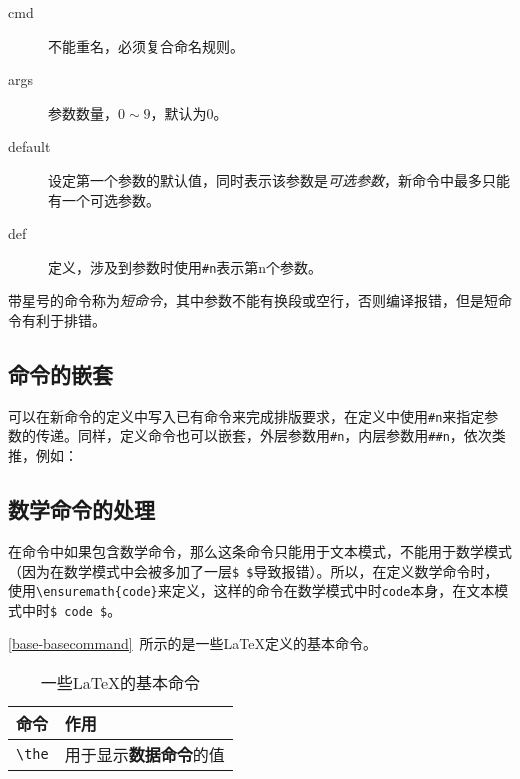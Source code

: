 \begin{description}
    \item[cmd] 不能重名，必须复合命名规则。
    \item[args] 参数数量，$ 0\sim9 $，默认为$ 0 $。
    \item[default] 设定第一个参数的默认值，同时表示该参数是\textit{可选参数}，新命令中最多只能有一个可选参数。
    \item[def] 定义，涉及到参数时使用\lstinline|#n|表示第n个参数。
\end{description}

带星号的命令称为\textit{短命令}，其中参数不能有换段或空行，否则编译报错，但是短命令有利于排错。

\begin{latex}
\newcommand{cmd}[args][default]{def}
\newcommand*{cmd}[args][default]{def}
\renewcommand{cmd}[args][default]{def}
\renewcommand*{cmd}[args][default]{def}
\end{latex}

\subsection{命令的嵌套}
可以在新命令的定义中写入已有命令来完成排版要求，在定义中使用\lstinline|#n|来指定参数的传递。同样，定义命令也可以嵌套，外层参数用\lstinline|#n|，内层参数用\lstinline|##n|，依次类推，例如：

\begin{latex}
\newcommand{\A}{\renewcommand{\B}{def}}
\end{latex}

\subsection{数学命令的处理}
在命令中如果包含数学命令，那么这条命令只能用于文本模式，不能用于数学模式（因为在数学模式中会被多加了一层\lstinline|$ $|导致报错）。所以，在定义数学命令时，使用\lstinline|\ensuremath{code}|来定义，这样的命令在数学模式中时\lstinline|code|本身，在文本模式中时\lstinline|$ code $|。

\autoref{base-basecommand}~所示的是一些\LaTeX{}定义的基本命令。

\begin{table}[h]
    \centering
    \begin{tabular}{ll}
        \toprule
        命令 & 作用\\
        \midrule
        \verb|\the| & 用于显示\textbf{数据命令}的值\\
        \bottomrule
    \end{tabular}
    \caption{一些\LaTeX{}的基本命令}
    \label{base-basecommand}
\end{table}

